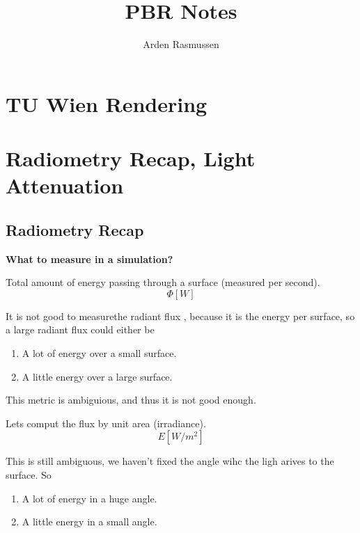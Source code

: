 \documentclass[
]{book}
\title{PBR Notes}
\author{Arden Rasmussen}
\date{}
\providecommand{\tightlist}{%
  \setlength{\itemsep}{0pt}\setlength{\parskip}{0pt}}
\begin{document}
\frontmatter
\maketitle

{
\setcounter{tocdepth}{2}
\tableofcontents
}
\mainmatter
\hypertarget{tu-wien-rendering}{%
\chapter{TU Wien Rendering}\label{tu-wien-rendering}}

\hypertarget{radiometry-recap-light-attenuation}{%
\chapter{Radiometry Recap, Light Attenuation}\label{radiometry-recap-light-attenuation}}

\hypertarget{radiometry-recap}{%
\section{Radiometry Recap}\label{radiometry-recap}}

\textbf{What to measure in a simulation?}

\begin{description}
\tightlist
\item[Radiant flux (or power)]
Total amount of energy passing through a surface (measured per second).
\[ \Phi \left[W\right]\]
\end{description}

It is not good to measurethe radiant flux , because it is the energy per
surface, so a large radiant flux could either be

\begin{enumerate}
\def\labelenumi{\arabic{enumi}.}
\tightlist
\item
  A lot of energy over a small surface.
\item
  A little energy over a large surface.
\end{enumerate}

This metric is ambiguious, and thus it is not good enough.

Lets comput the flux by unit area (irradiance).
\[E\left[W/m^2\right]\]

This is still ambiguous, we haven't fixed the angle wihc the ligh arives to the
surface. So

\begin{enumerate}
\def\labelenumi{\arabic{enumi}.}
\tightlist
\item
  A lot of energy in a huge angle.
\item
  A little energy in a small angle.
\end{enumerate}
\end{document}
